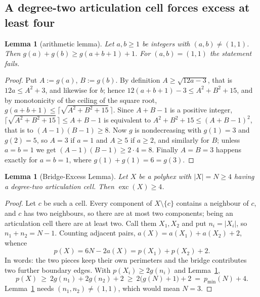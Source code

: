 \documentclass[11pt]{article}
\theoremstyle{plain}
\newtheorem{lemma}[theorem]{Lemma}
\theoremstyle{definition}
\theoremstyle{remark}
\newcommand{\sm}{\setminus}
\DeclareMathOperator{\exc}{exc}
\begin{document}
\subsection{A degree-two articulation cell forces excess at least four}\label{sec:11.3}


\begin{lemma}[arithmetic lemma]\label{lem:arith}
Let \(a,b\ge1\) be integers with \((a,b)\neq(1,1)\). Then
\(g(a)+g(b)\ge g(a+b+1)+1\). For \((a,b)=(1,1)\) the statement fails.
\end{lemma}

\begin{proof}
Put \(A:=g(a)\), \(B:=g(b)\). By definition \(A\ge\sqrt{12a-3}\), that is
\(12a\le A^{2}+3\), and likewise for \(b\); hence
\(12(a+b+1)-3\le A^{2}+B^{2}+15\), and by monotonicity of the ceiling of the square root,
\(g(a+b+1)\le\lceil\sqrt{A^{2}+B^{2}+15}\,\rceil\). Since \(A+B-1\) is a positive integer,
\(\lceil\sqrt{A^{2}+B^{2}+15}\,\rceil\le A+B-1\) is equivalent to
\(A^{2}+B^{2}+15\le(A+B-1)^{2}\), that is to \((A-1)(B-1)\ge8\). Now \(g\) is nondecreasing
with \(g(1)=3\) and \(g(2)=5\), so \(A=3\) if \(a=1\) and \(A\ge5\) if \(a\ge2\), and
similarly for \(B\); unless \(a=b=1\) we get \((A-1)(B-1)\ge2\cdot4=8\). Finally
\(A=B=3\) happens exactly for \(a=b=1\), where \(g(1)+g(1)=6=g(3)\).
\end{proof}

\begin{lemma}[Bridge-Excess Lemma]\label{lem:bridge-exc}
Let \(X\) be a polyhex with \(|X|=N\ge4\) having a degree-two articulation cell. Then
\(\exc(X)\ge4\).
\end{lemma}

\begin{proof}
Let \(c\) be such a cell. Every component of \(X\sm\{c\}\) contains a neighbour of \(c\),
and \(c\) has two neighbours, so there are at most two components; being an articulation
cell there are at least two. Call them \(X_{1},X_{2}\) and put \(n_{i}=|X_{i}|\), so
\(n_{1}+n_{2}=N-1\). Counting adjacent pairs, \(a(X)=a(X_{1})+a(X_{2})+2\), whence
\[
   p(X)=6N-2a(X)=p(X_{1})+p(X_{2})+2 .
\]
In words: the two pieces keep their own perimeters and the bridge contributes two further
boundary edges. With \(p(X_{i})\ge2g(n_{i})\) and Lemma~\ref{lem:arith},
\[
   p(X)\ \ge\ 2g(n_{1})+2g(n_{2})+2\ \ge\ 2\bigl(g(N)+1\bigr)+2\ =\ p_{\min}(N)+4 .
\]
Lemma~\ref{lem:arith} needs \((n_{1},n_{2})\neq(1,1)\), which would mean \(N=3\).
\end{proof}
\end{document}
